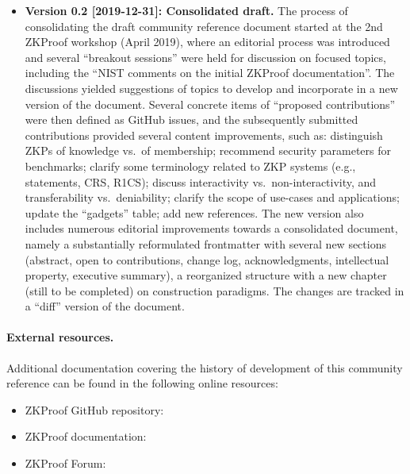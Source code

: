 \begin{itemize}
\item \textbf{Version 0.2 [2019-12-31]: Consolidated draft.}
	The process of consolidating the draft community reference document started at the 
2nd ZKProof workshop (April 2019), where an editorial process was introduced and 
several ``breakout sessions'' were held for discussion on focused topics, including
the ``NIST comments on the initial ZKProof documentation''.
	The discussions yielded suggestions of topics to develop and incorporate in a new version of the document.
	Several concrete items of ``proposed contributions'' were then defined as GitHub issues,
and the subsequently submitted contributions provided several content improvements, such as:
	distinguish ZKPs of knowledge vs.\ of membership;
	recommend security parameters for benchmarks;
	clarify some terminology related to ZKP systems (e.g., statements, CRS, R1CS);
	discuss interactivity vs.\ non-interactivity, and transferability vs.\ deniability;
	clarify the scope of use-cases and applications; 
	update the ``gadgets'' table; add new references.
	The new version also includes numerous editorial improvements towards a consolidated document, 
namely a substantially reformulated frontmatter with several new sections
(abstract, open to contributions, change log, acknowledgments, intellectual property, executive summary),
a reorganized structure with a new chapter (still to be completed) on construction paradigms.
	The changes are tracked in a ``diff'' version of the document.
\end{itemize}


\paragraph{External resources.}%
\label{par:prelim:change-log:external-resources}

Additional documentation covering the history of development of this 
community reference can be found in the following online resources:
\begin{itemize}[topsep=0pt,itemsep=1ex]
	\item ZKProof GitHub repository: 
	\item ZKProof documentation: \sloppy\mbox{}
	\item ZKProof Forum: 
\end{itemize}
